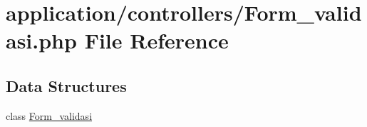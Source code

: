 \hypertarget{_form__validasi_8php}{}\section{application/controllers/\+Form\+\_\+validasi.php File Reference}
\label{_form__validasi_8php}
\subsection*{Data Structures}
\begin{DoxyCompactItemize}
\item 
class \mbox{\hyperlink{class_form__validasi}{Form\+\_\+validasi}}
\end{DoxyCompactItemize}
